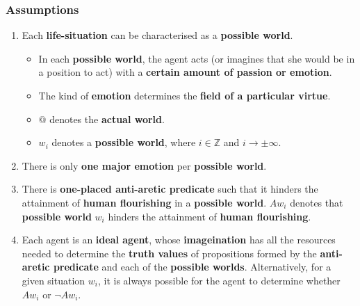 \documentclass[11pt]{article}
\begin{document}
\subsubsection{Assumptions}
\label{sec:orgf5c220d}
\begin{enumerate}
\item Each \textbf{life-situation} can be characterised as a \textbf{possible world}.
\begin{itemize}
\item In each \textbf{possible world}, the agent acts (or imagines that she would be in a position to act) with a \textbf{certain amount of passion or emotion}.
\item The kind of \textbf{emotion} determines the \textbf{field of a particular virtue}.
\item \(@\) denotes the \textbf{actual world}.
\item \(w_i\) denotes a \textbf{possible world}, where \(i \in \mathbb{Z}\) and \(i \rightarrow \pm \infty\).
\end{itemize}
\item There is only \textbf{one major emotion} per \textbf{possible world}.
\item There is \textbf{one-placed anti-aretic predicate} such that it hinders the attainment of \textbf{human flourishing} in a \textbf{possible world}.
\(Aw_i\) denotes that \textbf{possible world} \(w_i\) hinders the attainment of \textbf{human flourishing}.
\item Each agent is an \textbf{ideal agent}, whose \textbf{imageination} has all the resources needed to determine the \textbf{truth values} of propositions formed by the \textbf{anti-aretic predicate} and each of the \textbf{possible worlds}.
Alternatively, for a given situation \(w_i\), it is always possible for the agent to determine whether \(Aw_i\) or \(\neg Aw_i\).
\end{enumerate}

 \newpage
\end{document}
